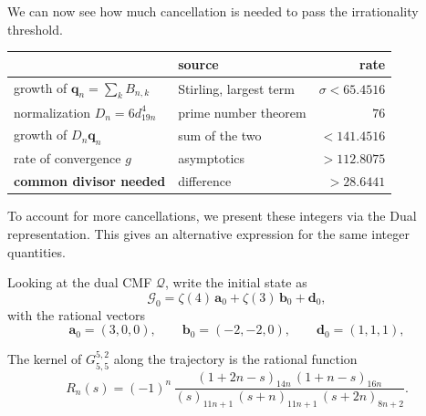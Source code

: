 We can now see how much cancellation is needed to pass the irrationality threshold.
\begin{table}[H]
\centering
\renewcommand{\arraystretch}{1.25}
\small
\begin{tabular}{llr}
\toprule
& source & rate\\
\midrule
growth of $\mathbf q_n=\sum_kB_{n,k}$ & Stirling, largest term & $\sigma<65.4516$\\
normalization $D_n=6d_{19n}^4$ & prime number theorem & $76$\\
\midrule
growth of $D_n\mathbf q_n$ & sum of the two & $<141.4516$\\
rate of convergence $g$ &  asymptotics & $>112.8075$\\
\midrule
\textbf{common divisor needed} & difference & $\boldsymbol{>28.6441}$\\
\bottomrule
\end{tabular}
\end{table}
To account for more cancellations, we present these integers via the Dual representation. This gives an alternative expression for the same integer quantities.

Looking at the dual CMF $\mathcal{Q}$, write the initial state as
\[\mathcal G_0=\zeta(4)\,\mathbf a_0+\zeta(3)\,\mathbf b_0+\mathbf d_0,\] with the rational vectors
\[
  \mathbf a_0=(3,0,0),\qquad \mathbf b_0=(-2,-2,0),\qquad \mathbf d_0=(1,1,1),
\]

The kernel of $G^{5,2}_{5,5}$ along the trajectory is the rational function
\[
  R_n(s)=(-1)^n\,\frac{(1+2n-s)_{14n}\,(1+n-s)_{16n}}
  {(s)_{11n+1}\,(s+n)_{11n+1}\,(s+2n)_{8n+2}} .
\]
%

